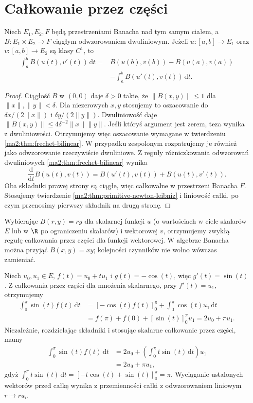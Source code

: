 \section{Całkowanie przez części}

\begin{twierdzenie}
\label{ma2:thm:primitive-parts}
Niech $E_1,E_2,F$ będą przestrzeniami Banacha
nad tym samym ciałem, a
$B:E_1\times E_2\to F$ ciągłym odwzorowaniem
dwuliniowym. Jeżeli $u:[a,b]\to E_1$
oraz $v:[a,b]\to E_2$ są klasy $C^1$,
to
\[
 \begin{aligned}
 \int_a^b B(u(t),v'(t))\,\mathrm dt
 ={}&B(u(b),v(b))-B(u(a),v(a))\\
 &-\int_a^b B(u'(t),v(t))\,\mathrm dt .
 \end{aligned}
\]
\end{twierdzenie}
\begin{proof}
Ciągłość $B$ w $(0,0)$ daje $\delta>0$
takie, że $\|B(x,y)\|\le1$ dla
$\|x\|,\|y\|<\delta$. Dla niezerowych
$x,y$ stosujemy to oszacowanie do
$\delta x/(2\|x\|)$ i $\delta y/(2\|y\|)$.
Dwuliniowość daje
$\|B(x,y)\|\le4\delta^{-2}\|x\|\|y\|$.
Jeśli któryś argument jest zerem, teza
wynika z dwuliniowości. Otrzymujemy
więc oszacowanie wymagane w twierdzeniu
\ref{ma2:thm:frechet-bilinear}.
W przypadku zespolonym rozpatrujemy je
również jako odwzorowanie rzeczywiście
dwuliniowe. Z reguły różniczkowania
odwzorowań dwuliniowych
\ref{ma2:thm:frechet-bilinear} wynika
\[
 \frac{\mathrm d}{\mathrm dt}B(u(t),v(t))
 =B(u'(t),v(t))+B(u(t),v'(t)).
\]
Oba składniki prawej strony są ciągłe,
więc całkowalne w przestrzeni Banacha $F$.
Stosujemy twierdzenie
\ref{ma2:thm:primitive-newton-leibniz}
i liniowość całki, po czym przenosimy
pierwszy składnik na drugą stronę.
\end{proof}

Wybierając $B(r,y)=ry$ dla skalarnej
funkcji $u$ (o wartościach w ciele skalarów
$E$ lub w $\R$ po ograniczeniu skalarów)
i wektorowej $v$, otrzymujemy
zwykłą regułę całkowania przez części
dla funkcji wektorowej. W algebrze Banacha
można przyjąć $B(x,y)=xy$; kolejności
czynników nie wolno wówczas zamieniać.

\begin{przyklad}
\label{ma2:ex:primitive-parts}
Niech $u_0,u_1\in E$, $f(t)=u_0+tu_1$
i $g(t)=-\cos(t)$, więc $g'(t)=\sin(t)$.
Z całkowania przez części dla mnożenia
skalarnego, przy $f'(t)=u_1$, otrzymujemy
\[
 \begin{aligned}
 \int_0^\pi \sin(t)f(t)\,\mathrm dt
 &=[-\cos(t)f(t)]_0^\pi
   +\int_0^\pi\cos(t)u_1\,\mathrm dt\\
 &=f(\pi)+f(0)+[\sin(t)]_0^\pi u_1
 =2u_0+\pi u_1.
 \end{aligned}
\]
Niezależnie, rozdzielając składniki
i stosując skalarne całkowanie przez części, mamy
\[
 \begin{aligned}
 \int_0^\pi \sin(t) f(t)\,\mathrm dt
 &=2u_0+\left(\int_0^\pi t\sin(t)\,\mathrm dt\right)u_1\\
 &=2u_0+\pi u_1,
 \end{aligned}
\]
gdyż
$\int_0^\pi t\sin(t)\,\mathrm dt
=[-t\cos(t)+\sin(t)]_0^\pi=\pi$.
Wyciąganie ustalonych wektorów przed
całkę wynika z przemienności całki z
odwzorowaniem liniowym $r\mapsto ru_i$.
\end{przyklad}

